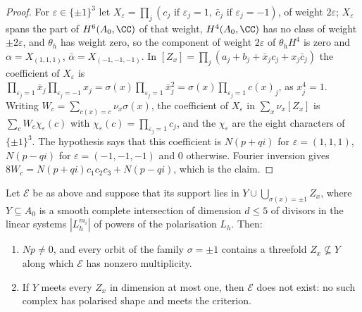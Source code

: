 \begin{proof}
For $\varepsilon\in\{\pm1\}^{3}$ let $X_{\varepsilon}=\prod_{j}(c_{j}\text{ if }\varepsilon_{j}=1,\ \bar c_{j}\text{ if }\varepsilon_{j}=-1)$, of weight $2\varepsilon$; $X_{\varepsilon}$ spans the part of $H^{6}(A_{0},\CC)$ of that weight, $H^{4}(A_{0},\CC)$ has no class of weight $\pm2\varepsilon$, and $\theta_{h}$ has weight zero, so the component of weight $2\varepsilon$ of $\theta_{h}H^{4}$ is zero and $\alpha=X_{(1,1,1)}$, $\bar\alpha=X_{(-1,-1,-1)}$. In $[Z_{x}]=\prod_{j}(a_{j}+b_{j}+\bar x_{j}c_{j}+x_{j}\bar c_{j})$ the coefficient of $X_{\varepsilon}$ is $\prod_{\varepsilon_{j}=1}\bar x_{j}\prod_{\varepsilon_{j}=-1}x_{j}=\sigma(x)\prod_{\varepsilon_{j}=1}\bar x_{j}^{2}=\sigma(x)\prod_{\varepsilon_{j}=1}c(x)_{j}$, as $x_{j}^{4}=1$. Writing $W_{c}=\sum_{c(x)=c}\nu_{x}\sigma(x)$, the coefficient of $X_{\varepsilon}$ in $\sum_{x}\nu_{x}[Z_{x}]$ is $\sum_{c}W_{c}\chi_{\varepsilon}(c)$ with $\chi_{\varepsilon}(c)=\prod_{\varepsilon_{j}=1}c_{j}$, and the $\chi_{\varepsilon}$ are the eight characters of $\{\pm1\}^{3}$. The hypothesis says that this coefficient is $N(p+qi)$ for $\varepsilon=(1,1,1)$, $N(p-qi)$ for $\varepsilon=(-1,-1,-1)$ and $0$ otherwise. Fourier inversion gives $8W_{c}=N(p+qi)c_{1}c_{2}c_{3}+N(p-qi)$, which is the claim.
\end{proof}

\begin{proposition}\label{prop:ci}
Let $\mathcal{E}$ be as above and suppose that its support lies in $Y\cup\bigcup_{\sigma(x)=\pm1}Z_{x}$, where $Y\subseteq A_{0}$ is a smooth complete intersection of dimension $d\le5$ of divisors in the linear systems $|L_{h}^{m_{i}}|$ of powers of the polarisation $L_{h}$. Then:
\begin{enumerate}
\item[(i)] $Np\ne0$, and every orbit of the family $\sigma=\pm1$ contains a threefold $Z_{x}\not\subseteq Y$ along which $\mathcal{E}$ has nonzero multiplicity.
\item[(ii)] If $Y$ meets every $Z_{x}$ in dimension at most one, then $\mathcal{E}$ does not exist: no such complex has polarised shape and meets the criterion.
\end{enumerate}
\end{proposition}

